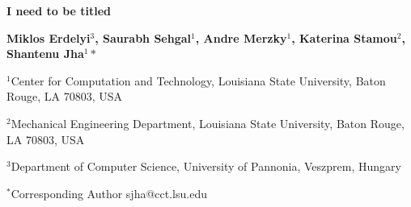 \documentclass[a4paper,11pt]{article}
\begin{document}
\begin{center}
\textbf {\large \bf I need to be titled }
\vspace{14pt}

\textbf {\normalsize \hspace{0.6 in} Miklos Erdelyi$^3$, Saurabh Sehgal$^1$, Andre Merzky$^1$,  \newline Katerina Stamou$^2$, Shantenu Jha$^1*$ }

\vspace{12pt}

\normalsize { \hspace{0.6 in} $^1$Center for Computation and Technology, \newline Louisiana State University, Baton Rouge, LA 70803, USA}

\normalsize {\hspace{0.6 in} $^2$Mechanical Engineering Department, \newline Louisiana State University, Baton Rouge, LA 70803, USA}

\normalsize { \hspace{0.6 in} $^3$Department of Computer Science, \newline University of Pannonia, Veszprem, Hungary}

\vspace{0.2in}
{\footnotesize {\hspace{0.0 in} $^*$Corresponding Author sjha@cct.lsu.edu}}


\vspace{12pt}
\end{center}


\vspace{12pt}
\end{document}
